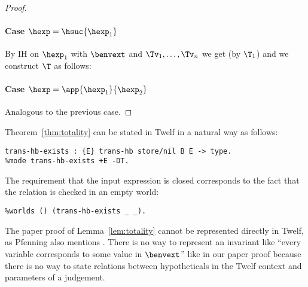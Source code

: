 \begin{proof}
\paragraph{Case $\hexp = \hsuc{\hexp_1}$}
By IH on $\hexp_1$ with $\benvext$ and $\Tv_1, \ldots, \Tv_n$ we get  (by $\T_1$) and we construct $\T$ as follows:
\begin{prooftree}
\end{prooftree}

\paragraph{Case $\hexp = \app{\hexp_1}{\hexp_2}$}
Analogous to the previous case.

\end{proof}

\Twelf
Theorem~\ref{thm:totality} can be stated in Twelf in a natural way as follows:
\begin{verbatim}
trans-hb-exists : {E} trans-hb store/nil B E -> type.
%mode trans-hb-exists +E -DT.
\end{verbatim}
The requirement that the input \hlang expression is closed corresponds to the fact that the relation is checked in an empty world:
\begin{verbatim}
%worlds () (trans-hb-exists _ _).
\end{verbatim}

The paper proof of Lemma~\ref{lem:totality} cannot be represented directly in Twelf, as Pfenning also mentions \cite{Pfenning01}.
There is no way to represent an invariant like ``every variable corresponds to some value in $\benvext$'' like in our paper proof because there is no way to state relations between hypotheticals in the Twelf context and parameters of a judgement.

